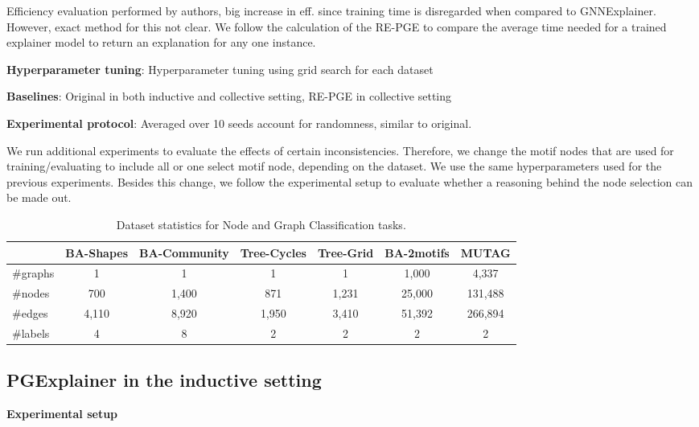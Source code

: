 Efficiency evaluation performed by authors, big increase in eff. since training time is disregarded when compared to GNNExplainer. However, exact method for this not clear. We follow the calculation of the RE-PGE to compare the average time needed for a trained explainer model to return an explanation for any one instance.

\textbf{Hyperparameter tuning}: Hyperparameter tuning using grid search for each dataset

\textbf{Baselines}: Original in both inductive and collective setting, RE-PGE in collective setting

\textbf{Experimental protocol}: Averaged over 10 seeds account for randomness, similar to original.


We run additional experiments to evaluate the effects of certain inconsistencies. Therefore, we change the motif nodes that are used for training/evaluating to include all or one select motif node, depending on the dataset. We use the same hyperparameters used for the previous experiments. Besides this change, we follow the experimental setup to evaluate whether a reasoning behind the node selection can be made out.


\begin{table}[h]
    \centering
    \scriptsize
    \begin{tabular}{l|cccc|cc}
    \hline
    \textbf{} & \textbf{BA-Shapes} & \textbf{BA-Community} & \textbf{Tree-Cycles} & \textbf{Tree-Grid} & \textbf{BA-2motifs} & \textbf{MUTAG} \\
    \hline
    \#graphs & 1 & 1 & 1 & 1 & 1,000 & 4,337 \\
    \#nodes  & 700 & 1,400 & 871 & 1,231 & 25,000 & 131,488 \\
    \#edges  & 4,110 & 8,920 & 1,950 & 3,410 & 51,392 & 266,894 \\
    \#labels & 4 & 8 & 2 & 2 & 2 & 2 \\
    \hline
    \end{tabular}
    \caption[Statistics of PGExplainer datasets]{Dataset statistics for Node and Graph Classification tasks.}
    \label{tab:dataset-statistics}
    \end{table}

\bigskip

\subsection{PGExplainer in the inductive setting}

\textbf{Experimental setup}


